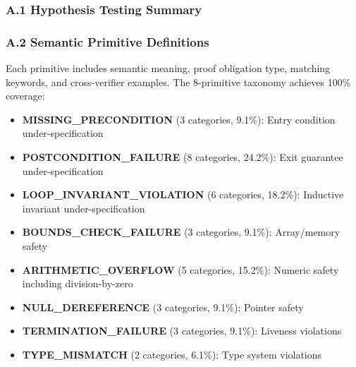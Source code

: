 
\subsubsection{A.1 Hypothesis Testing Summary}

\begin{table}[htbp]
\centering
{}
\end{table}

\subsubsection{A.2 Semantic Primitive Definitions}

Each primitive includes semantic meaning, proof obligation type, matching keywords, and cross-verifier examples. The 8-primitive taxonomy achieves 100\% coverage:

\begin{itemize}
\item \textbf{MISSING\_PRECONDITION} (3 categories, 9.1\%): Entry condition under-specification
\item \textbf{POSTCONDITION\_FAILURE} (8 categories, 24.2\%): Exit guarantee under-specification
\item \textbf{LOOP\_INVARIANT\_VIOLATION} (6 categories, 18.2\%): Inductive invariant under-specification
\item \textbf{BOUNDS\_CHECK\_FAILURE} (3 categories, 9.1\%): Array/memory safety
\item \textbf{ARITHMETIC\_OVERFLOW} (5 categories, 15.2\%): Numeric safety including division-by-zero
\item \textbf{NULL\_DEREFERENCE} (3 categories, 9.1\%): Pointer safety
\item \textbf{TERMINATION\_FAILURE} (3 categories, 9.1\%): Liveness violations
\item \textbf{TYPE\_MISMATCH} (2 categories, 6.1\%): Type system violations
\end{itemize}

